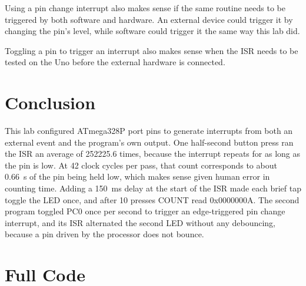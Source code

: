 \documentclass[11pt]{article}
\begin{document}
Using a pin change interrupt also makes sense if the same routine needs to be triggered by both software and hardware. An external device could trigger it by changing the pin's level, while software could trigger it the same way this lab did.

Toggling a pin to trigger an interrupt also makes sense when the ISR needs to be tested on the Uno before the external hardware is connected.

\section{Conclusion}
This lab configured ATmega328P port pins to generate interrupts from both an external event and the program's own output. One half-second button press ran the ISR an average of 252225.6 times, because the interrupt repeats for as long as the pin is low. At 42 clock cycles per pass, that count corresponds to about 0.66~s of the pin being held low, which makes sense given human error in counting time. Adding a 150~ms delay at the start of the ISR made each brief tap toggle the LED once, and after 10 presses COUNT read 0x0000000A. The second program toggled PC0 once per second to trigger an edge-triggered pin change interrupt, and its ISR alternated the second LED without any debouncing, because a pin driven by the processor does not bounce.

\appendix
\section{Full Code}
\label{app:code}




\end{document}
